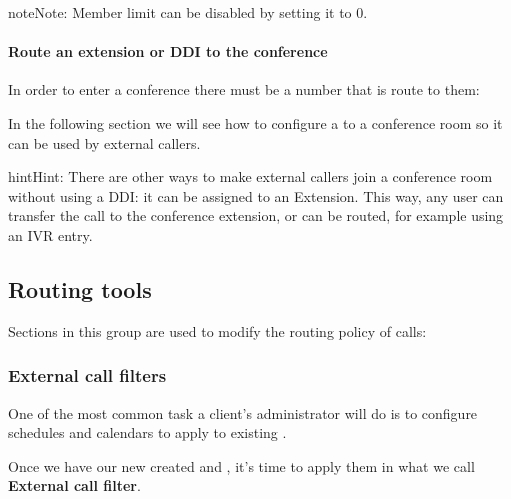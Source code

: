 \documentclass[letterpaper,10pt,english]{sphinxmanual}
\begin{document}
\begin{notice}{note}{Note:}
Member limit can be disabled by setting it to 0.
\end{notice}
\paragraph{Route an extension or DDI to the conference}

In order to enter a conference there must be a number that is route to them:

In the following section we will see how to configure a {\hyperref[administration_portal/brand/views/ddis:ddis]{}} to a conference room so it can be used by external callers.

\begin{notice}{hint}{Hint:}
There are other ways to make external callers join a conference room
without using a DDI: it can be assigned to an Extension. This way, any user
can transfer the call to the conference extension, or can be routed, for
example using an IVR entry.
\end{notice}


\subsection{Routing tools}
\label{administration_portal/client/vpbx/routing_tools/index::doc}\label{administration_portal/client/vpbx/routing_tools/index:routing-tools}
Sections in this group are used to modify the routing policy of calls:
\label{administration_portal/client/vpbx/routing_tools/external_call_filters:external-filters}

\subsubsection{External call filters}
\label{administration_portal/client/vpbx/routing_tools/external_call_filters:external-call-filters}\label{administration_portal/client/vpbx/routing_tools/external_call_filters:external-filters}\label{administration_portal/client/vpbx/routing_tools/external_call_filters::doc}\label{administration_portal/client/vpbx/routing_tools/external_call_filters:id1}
One of the most common task a client's administrator will do is to
configure schedules and calendars to apply to existing {\hyperref[administration_portal/brand/views/ddis:ddis]{}}.

Once we have our new created {\hyperref[administration_portal/client/vpbx/routing_tools/schedules:schedules]{}} and {\hyperref[administration_portal/client/vpbx/routing_tools/calendars:calendars]{}}, it's time to apply them
in what we call \textbf{External call filter}.
\end{document}

